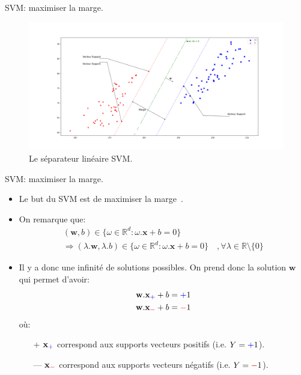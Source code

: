 \documentclass[8pt]{beamer}
\begin{document}
		\begin{frame}{SVM\@: maximiser la marge.}
			\begin{figure}[H]
				\includegraphics[width=\textwidth]{images/samples/svm}
				\caption*{ Le séparateur linéaire SVM.}
			\end{figure}
		\end{frame}

		\begin{frame}{SVM\@: maximiser la marge.}
			\begin{itemize}
				\item  Le but du SVM est de maximiser la marge~\cite{vapnik1998statistical}.
				\item  On remarque que:
				\begin{gather*}
					(\textbf{w}, b) \in \{\omega \in \mathbb{R}^d : \omega.\textbf{x} + b = 0\} \\
					\Rightarrow
					(\lambda . \textbf{w}, \lambda.b) \in \{\omega \in \mathbb{R}^d : \omega.\textbf{x} + b = 0\}\quad, \forall \lambda \in \mathbb{R}\setminus\{0\}
				\end{gather*}
				\item  Il y a donc une infinité de solutions possibles. On prend donc la solution $\textbf{w}$ qui permet d'avoir:
				\begin{align}
					\textbf{w}.\textbf{x}_{\color{blue}+} + b &= {\color{blue}+}1 \\
					\textbf{w}.\textbf{x}_{\color{red}-} + b &= {\color{red}-}1
				\end{align}
				où:
				\begin{itemize}
					\item[{\color{blue}+}] $\textbf{x}_{\color{blue}+}$ correspond aux supports vecteurs positifs (i.e. $Y={\color{blue}+}1$).
					\item[{\color{red}---}] $\textbf{x}_{\color{red}-}$ correspond aux supports vecteurs négatifs (i.e. $Y={\color{red}-}1$).
				\end{itemize}
			\end{itemize}
		\end{frame}
\end{document}

